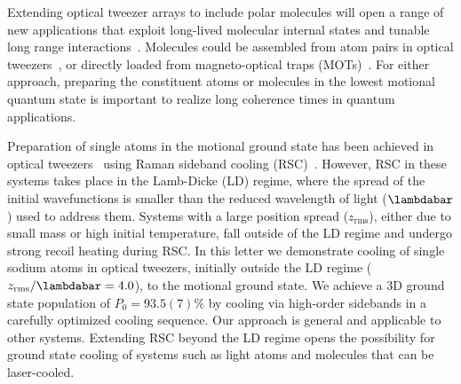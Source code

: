\documentclass[aps,prl,twocolumn,groupedaddress]{revtex4-1}
\begin{document}
Extending optical tweezer arrays to include polar molecules will open a range of
new applications that exploit long-lived molecular internal states
and tunable long range interactions~\cite{DeMille2002,Gorshkov2011,Yan2013}.
Molecules could be assembled from atom pairs in optical tweezers~\cite{Liu2017},
or directly loaded from magneto-optical traps
(MOTs)~\cite{Barry2014,Truppe2017SubDoppler,Anderegg2017}.
For either approach, preparing the constituent atoms or molecules in the lowest motional
quantum state is important to realize long coherence times in quantum applications.

Preparation of single atoms in the motional ground state has been achieved in optical tweezers~\cite{Kaufman2012,Thompson2013,Liu2017,Robens2017}
using Raman sideband cooling (RSC)~\cite{Monroe1995,Kerman2000,Han2000}.
However, RSC in these systems takes place in the Lamb-Dicke (LD) regime, where
the spread of the initial wavefunctions is smaller than the reduced wavelength of light
($\lambdabar$) used to address them.
Systems with a large position spread ($z_{\textrm{rms}}$),
either due to small mass or high initial temperature,
fall outside of the LD regime and undergo strong recoil heating during RSC.
In this letter we demonstrate cooling of single sodium atoms in optical tweezers,
initially outside the LD regime ($z_{\textrm{rms}}/\lambdabar=4.0$), to the motional ground state.
We achieve a 3D ground state population of $P_0=93.5(7)$\% by cooling via
high-order sidebands in a carefully optimized cooling sequence.
Our approach is general and applicable to
other systems. Extending RSC beyond the LD regime opens the possibility
for ground state cooling of systems such as light atoms and
molecules that can be laser-cooled.
\end{document}
